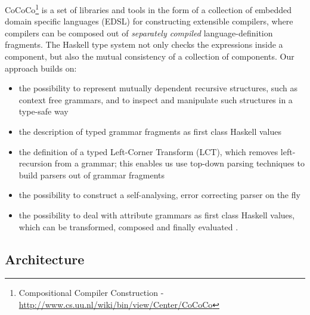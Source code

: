 CoCoCo\footnote{Compositional Compiler Construction - \url{http://www.cs.uu.nl/wiki/bin/view/Center/CoCoCo}} is a set of libraries and tools in the form of a collection of embedded domain specific languages (EDSL) for constructing extensible compilers,
where compilers can be composed out of \emph{separately compiled}  
language-definition fragments. The Haskell type system  not only checks the expressions inside a component, but also the mutual consistency of a collection of components. Our approach builds on:
\begin{itemize}
\item the possibility to represent mutually dependent 
recursive structures, such as context free grammars, and to inspect and manipulate such structures in a type-safe way \cite{BSV09}
\item the description of typed grammar fragments as first class Haskell values \cite{VSD12}
\item the definition of a typed Left-Corner Transform (LCT), which removes left-recursion from a grammar; this enables us
use top-down parsing techniques to build parsers out of grammar fragments \cite{BSV09b}
\item the possibility to construct a self-analysing, error correcting parser on the fly \cite{Swie2000,Swierstra08}
\item the possibility to deal with attribute grammars as first class  Haskell values, which can be transformed, composed and finally evaluated \cite{Viera:Attribute-Grammars,UU-CS-2011-028,VSM12}.
\end{itemize}

 

\subsection{Architecture}

